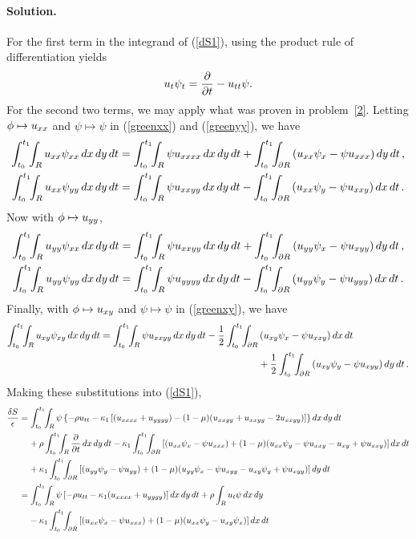 \documentclass[11pt]{article}
\newcommand{\refeq}[1]{(\ref{#1})}
\newcommand{\beq}{\begin{equation*}}
\newcommand{\eeq}{\end{equation*}}
\newenvironment{solution}
{
    \paragraph{Solution.}
    \ignorespaces
}
{
}
\begin{document}
\begin{solution}
	For the first term in the integrand of \refeq{dS1}, using the product rule of differentiation yields
	\beq
		\ut \psit = \pdv{}{t} (\ut \psi) - \utt \psi.
	\eeq
	For the second two terms, we may apply what was proven in problem~\ref{2}.  Letting $\phi \mapsto u_{xx}$ and $\psi \mapsto \psi$ in \refeq{greenxx} and \refeq{greenyy}, we have
	\begin{align*}
		\inttr \uxx \psixx \drt &= \inttr \psi \uxxxx \drt + \inttdr \left( \uxx \psix - \psi \uxxx \right) \dd{y} \dd{t}, \\
		\inttr \uxx \psiyy \drt &= \inttr \psi \uxxyy \drt - \inttdr \left( \uxx \psiy - \psi \uxxy \right) \dd{x} \dd{t}.
	\end{align*}
	Now with $\phi \mapsto u_{yy}$,
	\begin{align*}
		\inttr \uyy \psixx \drt &= \inttr \psi \uxxyy \drt + \inttdr \left( \uyy \psix - \psi \uxyy \right) \dd{y} \dd{t}, \\
		\inttr \uyy \psiyy \drt &= \inttr \psi \uyyyy \drt - \inttdr \left( \uyy \psiy - \psi \uyyy \right) \dd{x} \dd{t}.
	\end{align*}
	Finally, with $\phi \mapsto u_{xy}$ and $\psi \mapsto \psi$ in \refeq{greenxy}, we have
	\begin{align*}
		\inttr \uxy \psixy \drt = \inttr \psi \uxxyy \drt - \frac{1}{2} \inttdr &\left( \uxy \psix - \psi \uxxy \right) \dd{x} \dd{t} \\
		&+ \frac{1}{2} \inttdr \left( \uxy \psiy - \psi \uxyy \right) \dd{y} \dd{t}.
	\end{align*}
	Making these substitutions into \refeq{dS1},
	\begin{align*}
		\frac{\dS}{\eps} &= \inttr \psi \left\{ -\rho \utt - \kaq \left[ (\uxxxx + \uyyyy) - (1 - \mu) (\uxxyy + \uxxyy - 2 \uxxyy) \right] \right\} \drt \\
		&\phantom{=\ } + \rho \inttr \pdv{}{t} (\ut \psi) \drt - \kaq \inttdr \left[ (\uxx \psix - \psi \uxxx) + (1 - \mu) (\uxx \psiy - \psi \uxxy - \uxy + \psi \uxxy) \right] \dd{x} \dd{t} \\
		&\phantom{=\ } + \kaq \inttdr \left[ (\uyy \psiy - \psi \uyy) + (1 - \mu) (\uyy \psix - \psi \uxyy - \uxy \psiy + \psi \uxyy) \right] \dd{y} \dd{t} \\
		&= \inttr \psi \left[ -\rho \utt - \kaq (\uxxxx + \uyyyy) \right] \drt + \rho \intr \ut \psi \dd{x} \dd{y} \\
		&\phantom{=\ } - \kaq \inttdr \left[ (\uxx \psix - \psi \uxxx) + (1 - \mu) (\uxx \psiy - \uxy \psix) \right] \dd{x} \dd{t} \\

\end{align*}
\end{solution}
\end{document}
